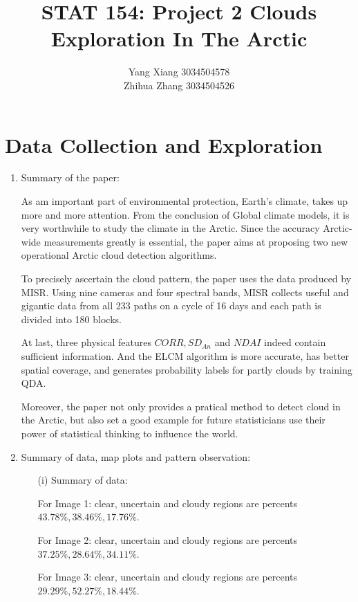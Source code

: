 \documentclass[11pt]{article}
\title{STAT 154: Project 2 Clouds Exploration In The Arctic}
\author{Yang Xiang 3034504578\\
Zhihua Zhang  3034504526}
\date{}
\begin{document}


\maketitle


\section{Data Collection and Exploration}
\begin{enumerate}[label=(\alph*)]
\item Summary of the paper:\par
\quad As am important part of environmental protection, Earth's climate, takes up more and more attention. From the conclusion of Global climate models, it is very worthwhile to study the climate in the Arctic. Since the accuracy Arctic-wide measurements greatly is essential, the paper aims at proposing two new operational Arctic cloud detection algorithms.\par
\quad To precisely ascertain the cloud pattern, the paper uses the data produced by MISR. Using nine cameras and four spectral bands, MISR collects useful and gigantic data from all 233 paths on a cycle of 16 days and each path is divided into 180 blocks.\par
\quad At last, three physical features $CORR, SD_{An}$ and $NDAI$ indeed contain sufficient information. And the ELCM algorithm is more accurate, has better spatial coverage, and generates probability labels for partly clouds by training QDA.\par
\quad Moreover, the paper not only provides a pratical method to detect cloud in the Arctic, but also set a good example for future statisticians use their power of statistical thinking to influence the world.

\item Summary of data, map plots and pattern observation:\par
\begin{enumerate}


\item[(i)] Summary of data:\par
\quad For Image 1: clear, uncertain and cloudy regions are percents $43.78\%,38.46\%,17.76\%$.\par \quad For Image 2: clear, uncertain and cloudy regions are percents $37.25\%,28.64\%,34.11\%$.\par
\quad For Image 3: clear, uncertain and cloudy regions are percents $29.29\%,52.27\%,18.44\%$.


\end{enumerate}
\end{enumerate}
\end{document}
